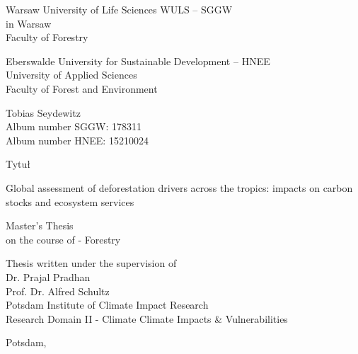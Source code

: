\begin{titlepage}
	\begin{singlespace}
		\begin{center}
			\Large{Warsaw University of Life Sciences WULS – SGGW}\\
			\Large{in Warsaw}\\
			\Large{Faculty of Forestry}

			\smallskip

			\Large{Eberswalde University for Sustainable Development – HNEE}\\
			\Large{University of Applied Sciences}\\
			\Large{Faculty of Forest and Environment}

			\bigskip

			\large{Tobias Seydewitz}\\
			\normalsize{Album number SGGW: 178311}\\
			\normalsize{Album number HNEE: 15210024}

			\vspace{2cm}
 
			 \huge{Tytuł}

			 \Large{Global assessment of deforestation drivers across the tropics: impacts on carbon stocks and ecosystem services}

			\bigskip

			\large{Master's Thesis}\\
			\large{on the course of - Forestry}

			\vspace{2cm}

			\begin{flushright}
				\normalsize{Thesis written under the supervision of}\\
				\normalsize{Dr. Prajal Pradhan}\\
				\normalsize{Prof. Dr. Alfred Schultz}\\
				\normalsize{Potsdam Institute of Climate Impact Research}\\
				\normalsize{Research Domain II - Climate Climate Impacts \& Vulnerabilities}
			\end{flushright}

			\bigskip

			\normalsize{Potsdam, \the\year}
		\end{center}
	\end{singlespace}
\end{titlepage}